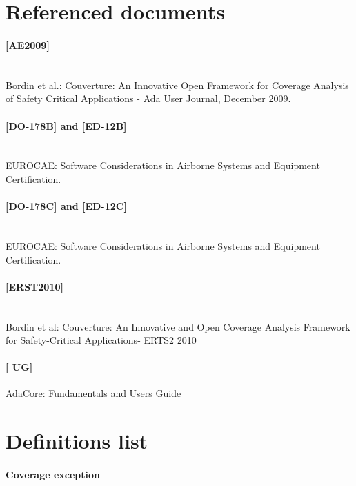 \newcommand{\erts}{[ERST2010]\space}
\newcommand{\adaeurope}{[AE2009]\space}
\newcommand{\castseventeen}{[CAST17]\space}

\section{Referenced documents}
\paragraph*{\adaeurope} \ \\
Bordin et al.: Couverture: An Innovative Open Framework for Coverage Analysis of Safety Critical Applications - Ada User Journal, December 2009.
\paragraph*{[DO-178B] and [ED-12B]} \ \\
EUROCAE: Software Considerations in Airborne Systems and Equipment Certification.
\paragraph*{[DO-178C] and [ED-12C]} \ \\
EUROCAE: Software Considerations in Airborne Systems and Equipment Certification.
\paragraph*{\erts} \ \\
Bordin et al: Couverture: An Innovative and Open Coverage Analysis Framework for Safety-Critical Applications- ERTS2 2010
\paragraph*{[\xcov{} UG]}
AdaCore: \xcov{} Fundamentals and Users Guide

\section{Definitions list}

\paragraph*{Coverage exception} \ \\

